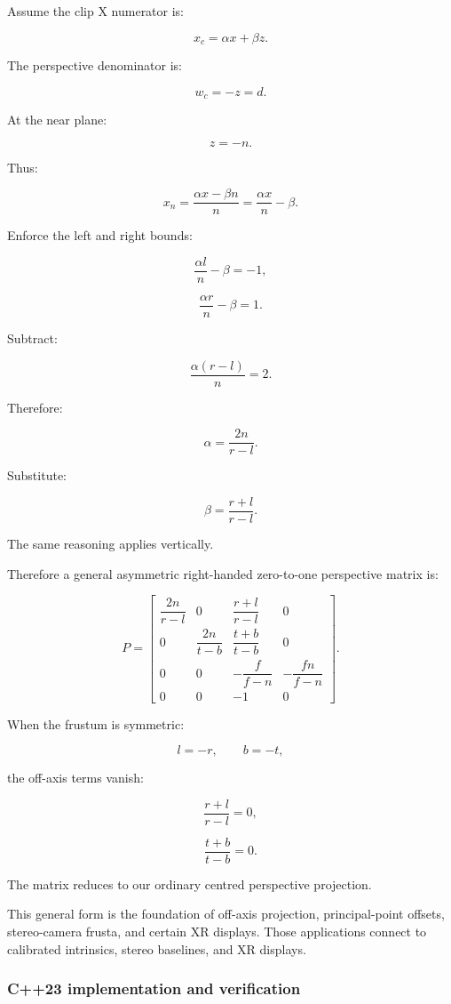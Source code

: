 Assume the clip X numerator is:

\[
 x_c=\alpha x+\beta z.
\]

The perspective denominator is:

\[
 w_c=-z=d.
\]

At the near plane:

\[
 z=-n.
\]

Thus:

\[
 x_n=\frac{\alpha x-\beta n}{n} = \frac{\alpha x}{n}-\beta.
\]

Enforce the left and right bounds:

\[
 \frac{\alpha l}{n}-\beta=-1,
\]

\[
 \frac{\alpha r}{n}-\beta=1.
\]

Subtract:

\[
 \frac{\alpha(r-l)}n=2.
\]

Therefore:

\[
 \boxed{ \alpha=\frac{2n}{r-l} }.
\]

Substitute:

\[
 \boxed{ \beta=\frac{r+l}{r-l} }.
\]

The same reasoning applies vertically.

Therefore a general asymmetric right-handed zero-to-one perspective matrix is:

\[
 \boxed{ P= \begin{bmatrix} \dfrac{2n}{r-l}&0&\dfrac{r+l}{r-l}&0\\ 0&\dfrac{2n}{t-b}&\dfrac{t+b}{t-b}&0\\ 0&0&-\dfrac f{f-n}&-\dfrac{fn}{f-n}\\ 0&0&-1&0 \end{bmatrix} }.
\]

When the frustum is symmetric:

\[
 l=-r,\qquad b=-t,
\]

the off-axis terms vanish:

\[
 \frac{r+l}{r-l}=0,
\]

\[
 \frac{t+b}{t-b}=0.
\]

The matrix reduces to our ordinary centred perspective projection.

This general form is the foundation of off-axis projection, principal-point offsets, stereo-camera frusta, and certain XR displays. Those applications connect to calibrated intrinsics, stereo baselines, and XR displays.

\subsubsection{C++23 implementation and verification}\label{c23-implementation-and-verification}

